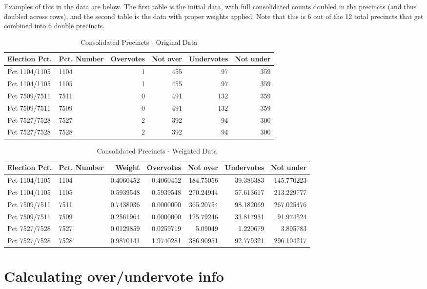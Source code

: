 \documentclass[12pt,twoside]{reedthesis}
\theoremstyle{definition}
\theoremstyle{definition}
\theoremstyle{definition}
\theoremstyle{remark}
\begin{document}
Examples of this in the data are below. The first table is the initial
data, with full consolidated counts doubled in the precincts (and thus
doubled across rows), and the second table is the data with proper
weights applied. Note that this is 6 out of the 12 total precincts that
get combined into 6 double precincts.
\begin{longtable}[t]{llrrrr}
\caption[Combined Precincts - Original]{\label{tab:unnamed-chunk-8}Consolidated Precincts - Original Data}\\
\toprule
Election Pct. & Pct. Number & Overvotes & Not over & Undervotes & Not under\\
\midrule
Pct 1104/1105 & 1104 & 1 & 455 & 97 & 359\\
Pct 1104/1105 & 1105 & 1 & 455 & 97 & 359\\
Pct 7509/7511 & 7511 & 0 & 491 & 132 & 359\\
Pct 7509/7511 & 7509 & 0 & 491 & 132 & 359\\
Pct 7527/7528 & 7527 & 2 & 392 & 94 & 300\\
Pct 7527/7528 & 7528 & 2 & 392 & 94 & 300\\
\bottomrule
\end{longtable}
\begin{longtable}[t]{llrrrrr}
\caption[Combined Precincts - Weighted]{\label{tab:unnamed-chunk-9}Consolidated Precincts - Weighted Data}\\
\toprule
Election Pct. & Pct. Number & Weight & Overvotes & Not over & Undervotes & Not under\\
\midrule
Pct 1104/1105 & 1104 & 0.4060452 & 0.4060452 & 184.75056 & 39.386383 & 145.770223\\
Pct 1104/1105 & 1105 & 0.5939548 & 0.5939548 & 270.24944 & 57.613617 & 213.229777\\
Pct 7509/7511 & 7511 & 0.7438036 & 0.0000000 & 365.20754 & 98.182069 & 267.025476\\
Pct 7509/7511 & 7509 & 0.2561964 & 0.0000000 & 125.79246 & 33.817931 & 91.974524\\
Pct 7527/7528 & 7527 & 0.0129859 & 0.0259719 & 5.09049 & 1.220679 & 3.895783\\
Pct 7527/7528 & 7528 & 0.9870141 & 1.9740281 & 386.90951 & 92.779321 & 296.104217\\
\bottomrule
\end{longtable}
\hypertarget{calculating-overundervote-info}{%
\section{Calculating over/undervote
info}\label{calculating-overundervote-info}}
\end{document}
